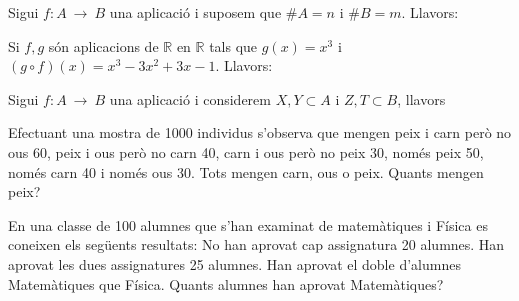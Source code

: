 \begin{enumerate}
\begin{enumerate}
\end{enumerate}
\feedback

\pregunta Sigui $f:A~\longrightarrow~B$ una aplicació i suposem que $\#A=n$
i $\#B=m$. Llavors:

\begin{enumerate}
\end{enumerate}
\feedback

\pregunta Si $f,g$ són aplicacions de $\mathbb{R}$ en $\mathbb{R}$ tals que $%
g(x)=x^{3}$ i $(g\circ f)(x)=x^{3}-3x^{2}+3x-1$. Llavors:

\begin{enumerate}
\end{enumerate}
\feedback

\pregunta Sigui $f:A~\longrightarrow~B$ una aplicació i considerem $%
X,Y\subset A$ i $Z,T\subset B$, llavors

\begin{enumerate}
\end{enumerate}
\feedback

\pregunta Efectuant una mostra de 1000 individus s'observa que mengen peix i
carn però no ous 60, peix i ous però no carn 40, carn i ous però
no peix 30, només peix 50, només carn 40 i només ous 30.
Tots mengen carn, ous o peix. Quants mengen peix?

\begin{enumerate}
\end{enumerate}
\feedback

\pregunta En una classe de 100 alumnes que s'han examinat de matemàtiques i Física es coneixen els següents resultats: No han aprovat cap
assignatura 20 alumnes. Han aprovat les dues assignatures 25 alumnes. Han
aprovat el doble d'alumnes Matemàtiques que Física.
Quants alumnes han aprovat Matemàtiques?


\end{enumerate}
